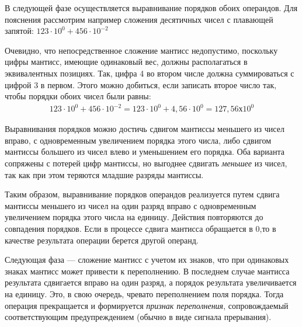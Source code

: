 \documentclass[a4paper,14pt]{extarticle}
\begin{document}
В следующей фазе осуществляется выравнивание порядков обоих операндов. Для пояснения рассмотрим например сложения десятичных чисел с плавающей запятой: $123 \cdot 10^0 + 456 \cdot 10^{-2}$

Очевидно, что непосредственное сложение мантисс недопустимо, поскольку цифры мантисс, имеющие одинаковый вес, должны располагаться в эквивалентных позициях. Так, цифра 4 во втором числе должна суммироваться с цифрой 3 в первом. Этого можно добиться, если записать второе число так, чтобы порядки обоих чисел были равны:
\begin{align*}
123 \cdot 10^0 + 456 \cdot 10^{-2}= 123 \cdot 10^0 + 4,56 \cdot 10^0 = 127,56 х 10^0
\end{align*}

Выравнивания порядков можно достичь сдвигом мантиссы меньшего из чисел вправо, с одновременным увеличением порядка этого числа, либо сдвигом мантиссы большего из чисел влево и уменьшением его порядка. Оба варианта сопряжены с потерей цифр мантиссы, но выгоднее сдвигать \textit{меньшее} из чисел, так как при этом теряются младшие разряды мантиссы.

Таким образом, выравнивание порядков операндов реализуется путем сдвига мантиссы меньшего из чисел на один разряд вправо с одновременным увеличением порядка этого числа на единицу. Действия повторяются до совпадения порядков. Если в процессе сдвига мантисса обращается в 0,то в качестве результата операции берется другой операнд.

Следующая фаза --- сложение мантисс с учетом их знаков, что при одинаковых знаках мантисс может привести к переполнению. В последнем случае мантисса результата сдвигается вправо на один разряд, а порядок результата увеличивается на единицу. Это, в свою очередь, чревато переполнением поля порядка. Тогда операция прекращается и формируется \textit{признак переполнения}, сопровождаемый соответствующим предупреждением (обычно в виде сигнала прерывания).
\end{document}
